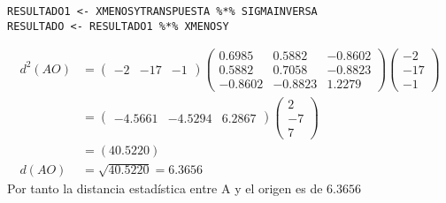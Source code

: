 \begin{sol}
\begin{verbatim}
RESULTADO1 <- XMENOSYTRANSPUESTA %*% SIGMAINVERSA
RESULTADO <- RESULTADO1 %*% XMENOSY
\end{verbatim}
\begin{align*}d^2(AO) &=
\begin{pmatrix}
-2&-17&-1
\end{pmatrix}
\begin{pmatrix}
0.6985 &  0.5882 & -0.8602 \\
0.5882 & 0.7058 & -0.8823  \\
-0.8602 & -0.8823 & 1.2279
\end{pmatrix}
\begin{pmatrix}
-2\\-17\\-1
\end{pmatrix}\\
&= \begin{pmatrix}
-4.5661 & -4.5294 & 6.2867
\end{pmatrix}\begin{pmatrix}
2\\-7\\7
\end{pmatrix}\\
&= (40.5220)\\
d(AO) &= \sqrt{40.5220}=6.3656
\end{align*}
Por tanto la distancia estadística entre A y el origen es de $6.3656$\\
\end{sol}
